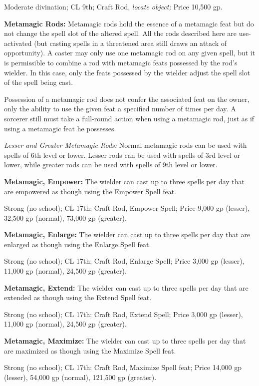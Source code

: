 \documentclass{article}
\begin{document}
Moderate divination; CL 9th; Craft Rod, \textit{locate object; }Price 10,500 gp.

\textbf{Metamagic Rods:} Metamagic rods hold the essence of a metamagic feat but 
do not change the spell slot of the altered spell. All the rods described here 
are use-activated (but casting spells in a threatened area still draws an attack 
of opportunity). A caster may only use one metamagic rod on any given spell, but 
it is permissible to combine a rod with metamagic feats possessed by the rod's 
wielder. In this case, only the feats possessed by the wielder adjust the spell 
slot of the spell being cast.

Possession of a metamagic rod does not confer the associated feat on the owner, 
only the ability to use the given feat a specified number of times per day. A sorcerer 
still must take a full-round action when using a metamagic rod, just as if using 
a metamagic feat he possesses.

\textit{Lesser and Greater Metamagic Rods: }Normal metamagic rods can be used with 
spells of 6th level or lower. Lesser rods can be used with spells of 3rd level 
or lower, while greater rods can be used with spells of 9th level or lower.

\textbf{Metamagic, Empower: }The wielder can cast up to three spells per day that 
are empowered as though using the Empower Spell feat.

Strong (no school); CL 17th; Craft Rod, Empower Spell; Price 9,000 gp (lesser), 
32,500 gp (normal), 73,000 gp (greater).

\textbf{Metamagic, Enlarge:} The wielder can cast up to three spells per day that 
are enlarged as though using the Enlarge Spell feat.

Strong (no school); CL 17th; Craft Rod, Enlarge Spell; Price 3,000 gp (lesser), 
11,000 gp (normal), 24,500 gp (greater).

\textbf{Metamagic, Extend: }The wielder can cast up to three spells per day that 
are extended as though using the Extend Spell feat.

Strong (no school); CL 17th; Craft Rod, Extend Spell; Price 3,000 gp (lesser), 
11,000 gp (normal), 24,500 gp (greater).

\textbf{Metamagic, Maximize:} The wielder can cast up to three spells per day that 
are maximized as though using the Maximize Spell feat.

Strong (no school); CL 17th; Craft Rod, Maximize Spell feat; Price 14,000 gp (lesser), 
54,000 gp (normal), 121,500 gp (greater).
\end{document}
